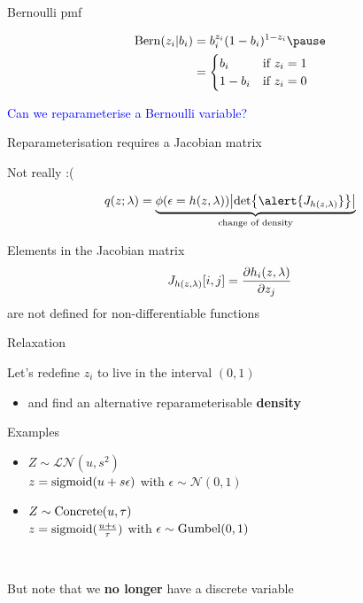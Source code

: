 \begin{frame}{Bernoulli pmf}

\begin{equation}
\begin{aligned}
\Bern(z_i|b_i) &= b_i^{z_i} (1 - b_i)^{1 - z_i} \pause \\
&= 
\begin{cases}
b_i & \text{if } z_i = 1 \\
1-b_i & \text{if } z_i = 0
\end{cases}
\end{aligned}
\end{equation}

\pause

\textcolor{blue}{Can we reparameterise a Bernoulli variable?}



\end{frame}

\begin{frame}{Reparameterisation requires a Jacobian matrix}


\alert{Not really :(} 

\begin{equation}
\begin{aligned}
q(z; \lambda) = \underbrace{\phi(\epsilon = h(z, \lambda)) \abs{\det \alert{J_{h(z, \lambda)}}}}_{\text{change of density}}
\end{aligned}
\end{equation}


Elements in the Jacobian matrix 
$$J_{h(z, \lambda)}[i,j] = \pdv{h_i(z, \lambda)}{z_j}$$
are not defined for non-differentiable functions


\end{frame}

\begin{frame}{Relaxation}

Let's redefine $z_i$ to live in the interval $(0,1)$
\begin{itemize}
	\item and find an alternative reparameterisable {\bf density}\\
\end{itemize}

Examples
\begin{itemize}
	\item $Z \sim \mathcal {LN}(u, s^2)$\\
	$z = \operatorname{sigmoid}(u +  s\epsilon)$ with $\epsilon \sim \mathcal N(0, 1)$
	\item $Z \sim \operatorname*{Concrete}(u, \tau)$\\
	$z= \operatorname{sigmoid}(\frac{u + \epsilon}{\tau})$ with $\epsilon \sim \operatorname*{Gumbel}(0, 1)$
\end{itemize}

~ \pause

But note that we {\bf no longer} have a discrete variable
	
\end{frame}

